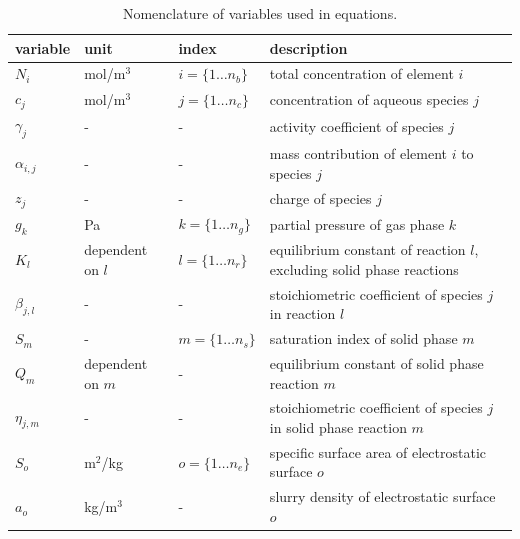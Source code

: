 \documentclass{article}
\begin{document}
\begin{table}[H]
\centering
\caption{Nomenclature of variables used in equations.}
\label{table:variables}
\begin{tabular}{l|l|l|l}
\toprule
variable        & unit                      & index                     & description                           \\ \midrule
$N_i$           & mol/m$^3$                 & $i = \{1 \ldots n_b\}$    & total concentration of element $i$                        \\
$c_j$           & mol/m$^3$                 & $j = \{1 \ldots n_c\}$    & concentration of aqueous species $j$                      \\
$\gamma_j$      & -                         & -                         & activity coefficient of species $j$                      \\
$\alpha_{i,j}$  &    -                      & -                         & mass contribution of element $i$ to species $j$ \\
$z_j$           &    -                      & -                         & charge of species $j$ \\
$g_k$           & Pa                        & $k = \{1 \ldots n_g\}$    & partial pressure of gas phase $k$                         \\
$K_l$           & dependent on $l$          & $l = \{1 \ldots n_r\}$    & equilibrium constant of reaction $l$, excluding solid phase reactions                      \\
$\beta_{j,l}$   & -                         & -                         & stoichiometric coefficient of species $j$ in reaction $l$\\
$S_m$           & -                         & $m = \{1 \ldots n_s\}$    & saturation index of solid phase $m$                      \\
$Q_m$           & dependent on $m$          & -                         & equilibrium constant of solid phase reaction $m$         \\
$\eta_{j,m}$    & -                         & -                         & stoichiometric coefficient of species $j$ in solid phase reaction $m$\\
$S_o$           & m$^2$/kg                  & $o = \{1 \ldots n_e\}$    & specific surface area of electrostatic surface $o$        \\
$a_o$           & kg/m$^3$                  & -                         & slurry density of electrostatic surface $o$        \\

\end{tabular}
\end{table}
\end{document}
